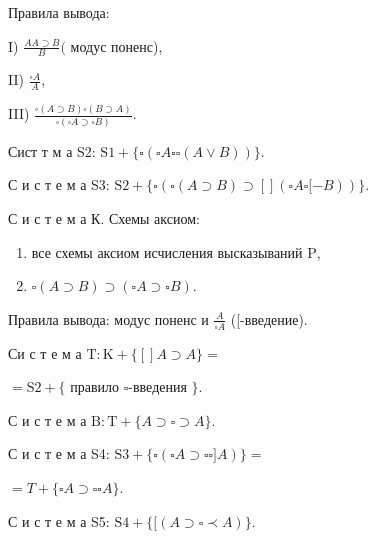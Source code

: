 \documentclass[10pt]{article}
\begin{document}
Правила вывода:



I) $\frac{A A \supset B}{B}($ модус поненс),



II) $\frac{\square A}{A}$,



III) $\frac{\square(A \supset B) \square(B \supset A)}{\square(\square A \supset \square B)}$.



Сист т м а S2: $\mathrm{S} 1+\{\square(\square A \square \square(A \vee B))\}$.



С и с т е м а S3: $\mathrm{S} 2+\{\square(\square(A \supset B) \supset[](\square A \square[-B))\}$.



С и с т е м а К. Схемы аксиом:



\begin{enumerate}

  \item все схемы аксиом исчисления высказываний $\mathrm{P}$,



  \item $\square(A \supset B) \supset(\square A \supset \square B)$.



\end{enumerate}



Правила вывода: модус поненс и $\frac{A}{\square A}$ ([-введение).



Си с т е м а $\mathrm{T}: \mathrm{K}+\{[] A \supset A\}=$



$=\mathrm{S} 2+\{$ правило $\square$-введения $\}$.



С и с т е м а $\mathrm{B}: \mathrm{T}+\{A \supset \square \supset A\}$.



С и с т е м а S4: $\mathrm{S3}+\{\square(\square A \supset \square \square] A)\}=$



$=T+\{\square A \supset \square \square A\}$.



С и с т е м а S5: $\mathrm{S} 4+\{[(A \supset \square \prec A)\}$.
\end{document}

